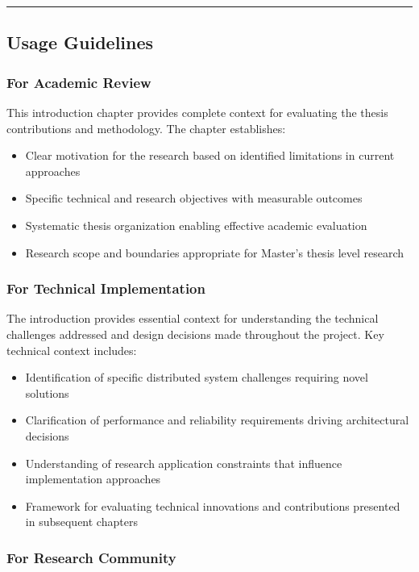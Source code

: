 \documentclass[11pt,a4paper]{article}
\begin{document}
\hrule

\subsection{Usage Guidelines}

\subsubsection{For Academic Review}

This introduction chapter provides complete context for evaluating the thesis
contributions and methodology. The
chapter establishes:

\begin{itemize}
\item Clear motivation for the research based on identified limitations in
current approaches
\item Specific technical and research objectives with measurable outcomes
\item Systematic thesis organization enabling effective academic evaluation
\item Research scope and boundaries appropriate for Master's thesis level
research

\end{itemize}
\subsubsection{For Technical Implementation}

The introduction provides essential context for understanding the technical
challenges addressed and design decisions
made throughout the project. Key technical context includes:

\begin{itemize}
\item Identification of specific distributed system challenges requiring novel
solutions
\item Clarification of performance and reliability requirements driving
architectural decisions
\item Understanding of research application constraints that influence
implementation approaches
\item Framework for evaluating technical innovations and contributions presented
in subsequent chapters

\end{itemize}
\subsubsection{For Research Community}
\end{document}
